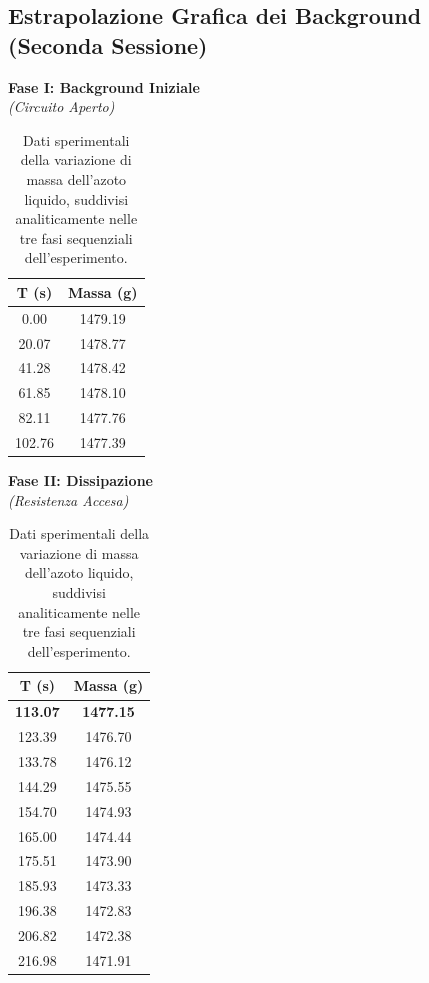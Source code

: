 \documentclass[a4paper,12pt]{article}
\begin{document}
\subsection{Estrapolazione Grafica dei Background (Seconda Sessione)}
\begin{table}[H]
\centering
\caption{Dati sperimentali della variazione di massa dell'azoto liquido, suddivisi analiticamente nelle tre fasi sequenziali dell'esperimento.}
\vspace{0.3cm}
\footnotesize 
\begin{minipage}[t]{0.31\textwidth}
\centering
\textbf{Fase I: Background Iniziale} \\
\textit{(Circuito Aperto)} \\
\vspace{0.2cm}
\begin{tabular}{cc}
\toprule
\textbf{T (s)} & \textbf{Massa (g)} \\
\midrule
0.00   & 1479.19\\
20.07  & 1478.77 \\
41.28  & 1478.42 \\
61.85  & 1478.10 \\
82.11  & 1477.76 \\
102.76 & 1477.39 \\
\bottomrule
\end{tabular}
\end{minipage}
\hfill
\begin{minipage}[t]{0.33\textwidth}
\centering
\textbf{Fase II: Dissipazione} \\
\textit{(Resistenza Accesa)} \\
\vspace{0.2cm}
\begin{tabular}{cc}
\toprule
\textbf{T (s)} & \textbf{Massa (g)} \\
\midrule
\textbf{113.07} & \textbf{1477.15} \\
123.39 & 1476.70 \\
133.78 & 1476.12 \\
144.29 & 1475.55 \\
154.70 & 1474.93 \\
165.00 & 1474.44 \\
175.51 & 1473.90 \\
185.93 & 1473.33 \\
196.38 & 1472.83 \\
206.82 & 1472.38 \\
216.98 & 1471.91 \\

\end{tabular}
\end{minipage}
\end{table}
\end{document}
